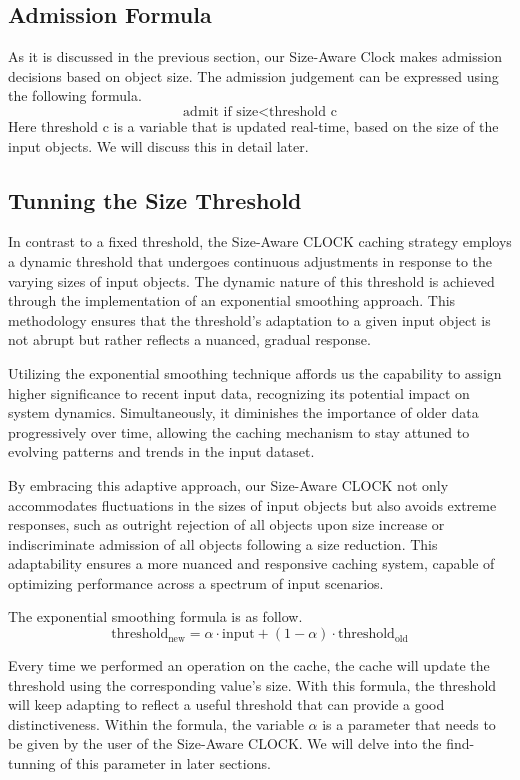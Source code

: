 \documentclass[journal,10.5pt,onecolumn]{IEEEtran}
\begin{document}
\subsection{Admission Formula}
As it is discussed in the previous section, our Size-Aware Clock makes admission decisions based on object size. The admission judgement can be expressed using the following formula.
\[
\text{admit if } \text{size} < \text{threshold} \text{ c}
\]
Here threshold c is a variable that is updated real-time, based on the size of the input objects. We will discuss this in detail later.

\subsection{Tunning the Size Threshold}
In contrast to a fixed threshold, the Size-Aware CLOCK caching strategy employs a dynamic threshold that undergoes continuous adjustments in response to the varying sizes of input objects. The dynamic nature of this threshold is achieved through the implementation of an exponential smoothing approach. This methodology ensures that the threshold's adaptation to a given input object is not abrupt but rather reflects a nuanced, gradual response.

Utilizing the exponential smoothing technique affords us the capability to assign higher significance to recent input data, recognizing its potential impact on system dynamics. Simultaneously, it diminishes the importance of older data progressively over time, allowing the caching mechanism to stay attuned to evolving patterns and trends in the input dataset.

By embracing this adaptive approach, our Size-Aware CLOCK not only accommodates fluctuations in the sizes of input objects but also avoids extreme responses, such as outright rejection of all objects upon size increase or indiscriminate admission of all objects following a size reduction. This adaptability ensures a more nuanced and responsive caching system, capable of optimizing performance across a spectrum of input scenarios. 

The exponential smoothing formula is as follow.
\[
\text{threshold}_{\text{new}} = \alpha \cdot \text{input} + (1 - \alpha) \cdot \text{threshold}_{\text{old}}
\]

Every time we performed an operation on the cache, the cache will update the threshold using the corresponding value's size. With this formula, the threshold will keep adapting to reflect a useful threshold that can provide a good distinctiveness.
Within the formula, the variable $\alpha$ is a parameter that needs to be given by the user of the Size-Aware CLOCK. We will delve into the find-tunning of this parameter in later sections.
\end{document}
